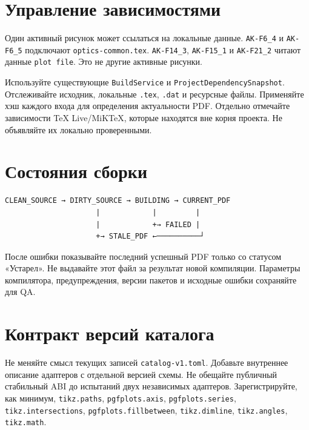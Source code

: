 \documentclass[11pt,a4paper,oneside]{scrreprt}
\begin{document}
\section{Управление зависимостями}\label{ux443ux43fux440ux430ux432ux43bux435ux43dux438ux435-ux437ux430ux432ux438ux441ux438ux43cux43eux441ux442ux44fux43cux438}

Один активный рисунок может ссылаться на локальные данные. \texttt{AK-F6\_4} и \texttt{AK-F6\_5} подключают \texttt{optics-common.tex}. \texttt{AK-F14\_3}, \texttt{AK-F15\_1} и \texttt{AK-F21\_2} читают данные \texttt{plot\ file}. Это не другие активные рисунки.

Используйте существующие \texttt{BuildService} и \texttt{ProjectDependencySnapshot}. Отслеживайте исходник, локальные \texttt{.tex}, \texttt{.dat} и ресурсные файлы. Применяйте хэш каждого входа для определения актуальности PDF. Отдельно отмечайте зависимости TeX Live/MiKTeX, которые находятся вне корня проекта. Не объявляйте их локально проверенными.

\section{Состояния сборки}\label{ux441ux43eux441ux442ux43eux44fux43dux438ux44f-ux441ux431ux43eux440ux43aux438}

\begin{verbatim}
CLEAN_SOURCE → DIRTY_SOURCE → BUILDING → CURRENT_PDF
                     |            |         |
                     |            +→ FAILED | 
                     +→ STALE_PDF ←──────────┘
\end{verbatim}

После ошибки показывайте последний успешный PDF только со статусом «Устарел». Не выдавайте этот файл за результат новой компиляции. Параметры компилятора, предупреждения, версии пакетов и исходные ошибки сохраняйте для QA.

\section{Контракт версий каталога}\label{ux43aux43eux43dux442ux440ux430ux43aux442-ux432ux435ux440ux441ux438ux439-ux43aux430ux442ux430ux43bux43eux433ux430}

Не меняйте смысл текущих записей \texttt{catalog-v1.toml}. Добавьте внутреннее описание адаптеров с отдельной версией схемы. Не обещайте публичный стабильный ABI до испытаний двух независимых адаптеров. Зарегистрируйте, как минимум, \texttt{tikz.paths}, \texttt{pgfplots.axis}, \texttt{pgfplots.series}, \texttt{tikz.intersections}, \texttt{pgfplots.fillbetween}, \texttt{tikz.dimline}, \texttt{tikz.angles}, \texttt{tikz.math}.
\end{document}

